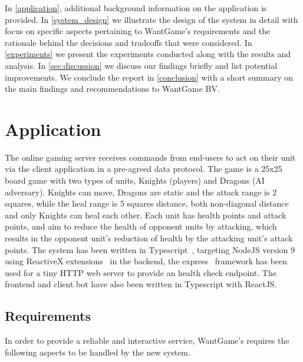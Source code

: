 \documentclass[a4paper]{IEEEtran}
\begin{document}
  In \autoref{application}, additional background information on the application is provided. In \autoref{system_design} we illustrate the design of the system in detail with focus on specific aspects pertaining to WantGame's requirements and the rationale behind the decisions and tradeoffs that were considered. In \autoref{experiments} we present the experiments conducted along with the results and analysis. In \autoref{sec:discussion} we discuss our findings briefly and list potential improvements. We conclude the report in \autoref{conclusion} with a short summary on the main findings and recommendations to WantGame BV.
  
  \section{Application} \label{application}
  
  The online gaming server receives commands from end-users to act on their unit via the client application in a pre-agreed data protocol. The game is a 25x25 board game with two types of units, Knights (players) and Dragons (AI adversary). Knights can move, Dragons are static and the attack range is 2 squares, while the heal range is 5 squares distance, both non-diagonal distance and only Knights can heal each other. Each unit has health points and attack points, and aim to reduce the health of opponent units by attacking, which results in the opponent unit's reduction of health by the attacking unit's attack points. The system has been written in Typescript~\cite{typescript}, targeting NodeJS version 9 using ReactiveX extensions~\cite{reactivex} in the backend, the express~\cite{express} framework has been used for a tiny HTTP web server to provide an health check endpoint. The frontend and client bot have also been written in Typescript with ReactJS.
  
  \subsection{Requirements}
  
  In order to provide a reliable and interactive service, WantGame's requires the following aspects to be handled by the new system.
  
\end{document}
